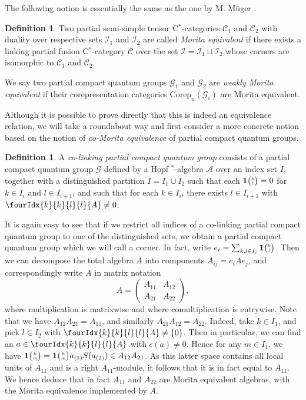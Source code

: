 \documentclass[11pt]{article}
\newcommand{\Corep}{\mathrm{Corep}}
\newcommand{\CatCC}{\mathscr{C}}
\newcommand{\Grt}[3]{#1{\tiny {\begin{pmatrix} #2\\#3\end{pmatrix}}}}
\newcommand{\UnitC}[2]{\Grt{\mathbf{1}}{#1}{#2}}
\newcommand{\Gr}[5]{\fourIdx{#2}{#4}{#3}{#5}{#1}}%
\theoremstyle{definition}
\newtheorem{Def}[Theorem]{Definition}
\numberwithin{equation}{section}
\begin{document}
The following notion is essentially the same as the one by M. M\"{u}ger \cite{Mug1}. 

\begin{Def} Two partial semi-simple tensor C$^*$-categories $\CatCC_1$ and $\CatCC_2$ with duality over respective sets $\mathscr{I}_1$ and $\mathscr{I}_2$ are called \emph{Morita equivalent} if there exists a linking partial fusion C$^*$-category $\CatCC$ over the set $\mathscr{I}=\mathscr{I}_1\sqcup \mathscr{I}_2$ whose corners are isomorphic to $\CatCC_1$ and $\CatCC_2$.

We say two partial compact quantum groups $\mathscr{G}_1$ and $\mathscr{G}_2$ are \emph{weakly Morita equivalent} if their corepresentation categories $\Corep_u(\mathscr{G}_i)$ are Morita equivalent. 
\end{Def} 

Although it is possible to prove directly that this is indeed an equivalence relation, we will take a roundabout way and first consider a more concrete notion based on the notion of \emph{co-Morita equivalence} of partial compact quantum groups.

\begin{Def}\label{DefCoLink} A \emph{co-linking partial compact quantum group} consists of a partial compact quantum group $\mathscr{G}$ defined by a Hopf $^*$-algebra $\mathscr{A}$ over an index set $I$, together with a distinguished partition $I = I_1\cup I_2$ such that each $\UnitC{k}{l}=0$ for $k\in I_i$ and $l\in I_{i+1}$, and such that for each $k\in I_i$, there exists $l\in I_{i+1}$ with $\Gr{A}{k}{l}{k}{l}\neq 0$.  
\end{Def} 

It is again easy to see that if we restrict all indices of a co-linking partial compact quantum group to one of the distinguished sets, we obtain a partial compact quantum group which we will call a corner. In fact, write $e_i = \sum_{k,l\in I_i} \UnitC{k}{l}$. Then we can decompose the total algebra $A$ into components $A_{ij} = e_{i}Ae_{j}$, and correspondingly write $A$ in matrix notation \[ A = \begin{pmatrix} A_{11} & A_{12}  \\ A_{21} & A_{22}\end{pmatrix},\] where multiplication is matrixwise and where comultiplication is entrywise. Note that we have $A_{12}A_{21} = A_{11}$, and similarly $A_{21}A_{12} = A_{22}$. Indeed, take $k\in I_1$, and pick $l\in I_2$ with $\Gr{A}{k}{l}{k}{l}\neq \{0\}$. Then in particular, we can find an $a\in \Gr{A}{k}{l}{k}{l}$ with $\epsilon(a)\neq 0$. Hence for any $m\in I_1$, we have $\UnitC{k}{m} = \UnitC{k}{m} a_{(1)}S(a_{(2)}) \in A_{12}A_{21}$. As this latter space contains all local units of $A_{11}$ and is a right $A_{11}$-module, it follows that it is in fact equal to $A_{11}$. We hence deduce that in fact $A_{11}$ and $A_{22}$ are Morita equivalent algebras, with the Morita equivalence implemented by $A$. %
\end{document}
